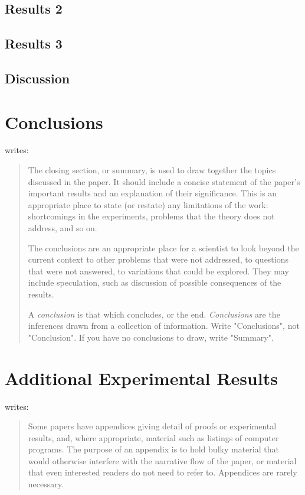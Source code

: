 \documentclass[a4paper,oneside,bibliography=totoc]{scrbook}
\begin{document}
\section{Results 2}

\section{Results 3}
\section{Discussion}

\chapter{Conclusions}

\citet{zobel2004} writes:

\blockcquote{zobel2004}{%
  The closing section, or summary, is used to draw together the topics discussed
  in the paper. It should include a concise statement of the paper's important
  results and an explanation of their significance. This is an appropriate place
  to state (or restate) any limitations of the work: shortcomings in the
  experiments, problems that the theory does not address, and so on.

  The conclusions are an appropriate place for a scientist to look beyond the
  current context to other problems that were not addressed, to questions that
  were not answered, to variations that could be explored. They may include
  speculation, such as discussion of possible consequences of the results.

  A \emph{conclusion} is that which concludes, or the end. \emph{Conclusions}
  are the inferences drawn from a collection of information. Write
  "Conclusions", not "Conclusion". If you have no conclusions to draw, write
  "Summary".}




\appendix
\chapter{Additional Experimental Results}

\citet{zobel2004} writes:

\blockcquote{zobel2004}{%
  Some papers have appendices giving detail of proofs or experimental results,
  and, where appropriate, material such as listings of computer programs. The
  purpose of an appendix is to hold bulky material that would otherwise
  interfere with the narrative flow of the paper, or material that even
  interested readers do not need to refer to. Appendices are rarely necessary.}
\end{document}
